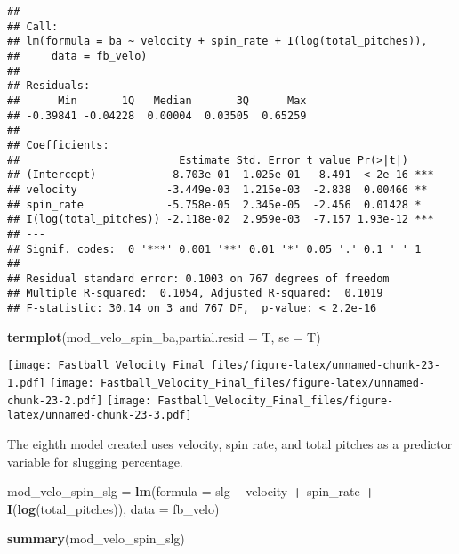 \documentclass[]{article}
\newenvironment{Shaded}{\begin{snugshade}}{\end{snugshade}}
\newcommand{\KeywordTok}[1]{\textcolor[rgb]{0.13,0.29,0.53}{\textbf{#1}}}
\newcommand{\DataTypeTok}[1]{\textcolor[rgb]{0.13,0.29,0.53}{#1}}
\newcommand{\StringTok}[1]{\textcolor[rgb]{0.31,0.60,0.02}{#1}}
\newcommand{\OperatorTok}[1]{\textcolor[rgb]{0.81,0.36,0.00}{\textbf{#1}}}
\newcommand{\NormalTok}[1]{#1}
\begin{document}
\begin{verbatim}
## 
## Call:
## lm(formula = ba ~ velocity + spin_rate + I(log(total_pitches)), 
##     data = fb_velo)
## 
## Residuals:
##      Min       1Q   Median       3Q      Max 
## -0.39841 -0.04228  0.00004  0.03505  0.65259 
## 
## Coefficients:
##                         Estimate Std. Error t value Pr(>|t|)    
## (Intercept)            8.703e-01  1.025e-01   8.491  < 2e-16 ***
## velocity              -3.449e-03  1.215e-03  -2.838  0.00466 ** 
## spin_rate             -5.758e-05  2.345e-05  -2.456  0.01428 *  
## I(log(total_pitches)) -2.118e-02  2.959e-03  -7.157 1.93e-12 ***
## ---
## Signif. codes:  0 '***' 0.001 '**' 0.01 '*' 0.05 '.' 0.1 ' ' 1
## 
## Residual standard error: 0.1003 on 767 degrees of freedom
## Multiple R-squared:  0.1054, Adjusted R-squared:  0.1019 
## F-statistic: 30.14 on 3 and 767 DF,  p-value: < 2.2e-16
\end{verbatim}

\begin{Shaded}
\begin{Highlighting}[]
\KeywordTok{termplot}\NormalTok{(mod_velo_spin_ba,}\DataTypeTok{partial.resid =}\NormalTok{ T, }\DataTypeTok{se =}\NormalTok{ T)}
\end{Highlighting}
\end{Shaded}

\texttt{[image: Fastball\_Velocity\_Final\_files/figure-latex/unnamed-chunk-23-1.pdf]}
\texttt{[image: Fastball\_Velocity\_Final\_files/figure-latex/unnamed-chunk-23-2.pdf]}
\texttt{[image: Fastball\_Velocity\_Final\_files/figure-latex/unnamed-chunk-23-3.pdf]}

The eighth model created uses velocity, spin rate, and total pitches as
a predictor variable for slugging percentage.

\begin{Shaded}
\begin{Highlighting}[]
\NormalTok{mod_velo_spin_slg =}\StringTok{ }\KeywordTok{lm}\NormalTok{(}\DataTypeTok{formula =}\NormalTok{ slg }\OperatorTok{~}\StringTok{ }\NormalTok{velocity }\OperatorTok{+}\StringTok{ }\NormalTok{spin_rate }\OperatorTok{+}\StringTok{ }\KeywordTok{I}\NormalTok{(}\KeywordTok{log}\NormalTok{(total_pitches)), }\DataTypeTok{data =}\NormalTok{ fb_velo)}
\end{Highlighting}
\end{Shaded}

\begin{Shaded}
\begin{Highlighting}[]
\KeywordTok{summary}\NormalTok{(mod_velo_spin_slg)}
\end{Highlighting}
\end{Shaded}
\end{document}
